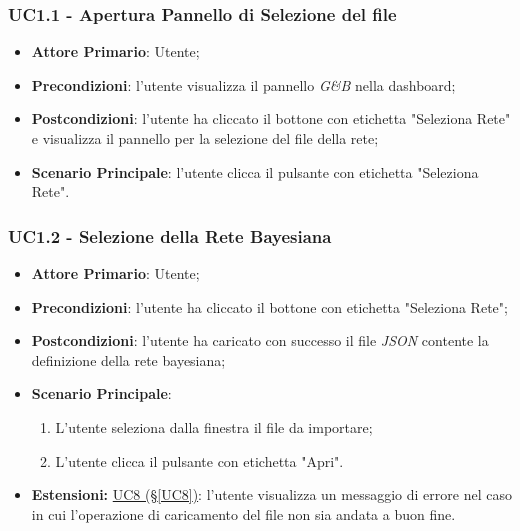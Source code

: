 \pagebreak

\subsubsection{UC1.1 - Apertura Pannello di Selezione del file}\label{UC1.1}
\begin{itemize}
	\item \textbf{Attore Primario}: Utente;
	\item \textbf{Precondizioni}: l'utente visualizza il pannello \textit{G\&B} nella dashboard;
	\item \textbf{Postcondizioni}: l'utente ha cliccato il bottone con etichetta "Seleziona Rete" e visualizza il pannello per la selezione del file della rete;
	\item \textbf{Scenario Principale}: l'utente clicca il pulsante con etichetta "Seleziona Rete".
\end{itemize}


\subsubsection{UC1.2 - Selezione della Rete Bayesiana}\label{UC1.2}
\begin{itemize}
	\item \textbf{Attore Primario}: Utente;
	\item \textbf{Precondizioni}: l'utente ha cliccato il bottone con etichetta "Seleziona Rete";
	\item \textbf{Postcondizioni}: l'utente ha caricato con successo il file \textit{JSON} contente la definizione della rete bayesiana;
	\item \textbf{Scenario Principale}:
	\begin{enumerate}
		\item L'utente seleziona dalla finestra il file da importare;
		\item L'utente clicca il pulsante con etichetta "Apri".
	\end{enumerate}
	\item \textbf{Estensioni:} \hyperref[UC8]{UC8 (§\ref*{UC8})}: l'utente visualizza un messaggio di errore nel caso in cui l'operazione di caricamento del file non sia andata a buon fine.
\end{itemize}

\pagebreak

